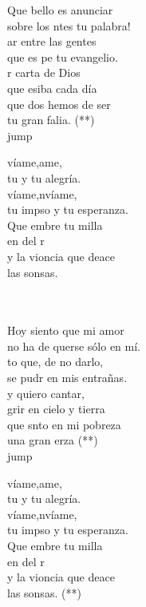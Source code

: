 \begin{cancion}%
	Que bello es anunciar \\
	sobre los ntes tu palabra!\\
	ar entre las gentes \\
	que es pe tu evangelio.\\
	r carta de Dios\\
	que esiba cada día\\
	que dos hemos de ser \\
	tu gran falia. (**)\\jump\\
	\begin{chorus}%
	víame,ame, \\
	tu y tu alegría.\\
	víame,nvíame,\\
	tu impso y tu esperanza.\\
	Que embre tu milla\\
	en  del r\\
	y la vioncia que deace \\
	las sonsas.\\
	\end{chorus}%
	\jump\\
	\jump\\
Hoy siento que mi amor \\
	no ha de querse sólo en mí.\\
	to que, de no darlo,\\
	se pudr en mis entrañas.\\
	y quiero cantar,\\
	grir en cielo y tierra\\
	que snto en mi pobreza \\
	una gran erza (**)\\jump\\
	\begin{chorus}%
	víame,ame, \\
	tu y tu alegría.\\
	víame,nvíame,\\
	tu impso y tu esperanza.\\
	Que embre tu milla\\
	en  del r\\
	y la vioncia que deace \\
	las sonsas. (**)\\
	\end{chorus}%
	\jump\\
\end{cancion}%
